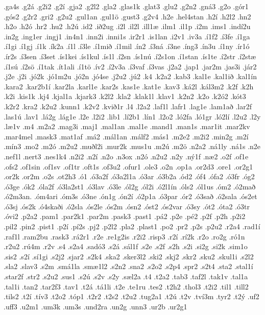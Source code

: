 {.ga4s
.g2á
.g2i2
.g2í
.gja2
.g2l2
.gla2
.glas1k
.glat3
.glu2
.g2n2
.gná3
.g2o
.gór1
.gós2
.g2r2
.gri2
.g2u2
.gul1an
.gul1ö
.gust3
.g2v4
.h2e
.hel4stan
.h2í
.h2l2
.hn2
.h2o
.h2ó
.hr2
.hu2
.h2ú
.id2
.ið2ug
.i2l
.il2l
.ill1æ
.ilm1
.il1p
.i2m
.ims1
.indí2u
.in2g
.ing1er
.ingj1
.in4n1
.inn2i
.inni1s
.ir2r1
.is1lan
.i2v1
.iv3a
.í1f2
.í3fe
.í1ga
.í1gi
.í1gj
.í1k
.ík2a
.í1l
.í3le
.í1mið
.í1mil
.ín2
.í3ná
.í3ne
.íng3
.ín3u
.í1ny
.ír1ó
.ír2s
.í3sen
.í3set
.ís1kei
.ís1kul
.ís1l
.í2sn
.ís1nú
.í2s1on
.í1stan
.ís1te
.í2str
.í2stæ
.í1sú
.í2sö
.í1tak
.ít1ali
.í1tö
.ív2
.í2v3a
.í3vaf
.í3vas
.j2a2
.jap1
.jar2m
.jas3i
.jár2
.j2e
.j2i
.jó2k
.jó1m2u
.jó2n
.jó4se
.j2u2
.jú2
.k4
.k2a2
.kab3
.kal1e
.kal1ið
.kal1ín
.kara2
.kar2b1í
.kar2la
.karl1e
.kar2s
.kas1e
.kat1e
.kav3
.ká2l
.kál3m2
.k2f
.k2h
.k2i
.kis1k
.kj4
.kjal1a
.kjark3
.k2l2
.kla2
.klak1l
.klav1
.k2n2
.k2o
.k2ó2
.kót3
.k2r2
.kra2
.k2u2
.kunn1
.k2v2
.kvið1r
.l4
.l2a2
.laf1l
.lafr1
.lag1e
.lam1að
.lar2f
.las1ú
.lav1
.lá2g
.lág1e
.l2e
.l2i2
.lib1
.lí2b1
.lín1
.l2o2
.ló2fa
.ló1gr
.ló2lí
.l2u2
.l2y
.læ1v
.m4
.m2a2
.mag3i
.maj1
.mal1an
.mal1e
.mand1
.man1s
.mar1it
.mar2kv
.mar4mel
.mask3
.mat1af
.má2
.mál1an
.málf2
.más1
.m2e2
.m2i2
.min2g
.m2í
.mín3
.mo2
.m2ó
.m2u2
.muðl2i
.mur2k
.mus1u
.m2ú
.m2ö
.n2a2
.ná1ly
.ná1s
.n2e
.nef1l
.nert3
.nes1k4
.n2i2
.n2í
.n2o
.n3ox
.n2ó
.n2u2
.n2y
.ný1f
.næ2
.o2f
.of1e
.ofs2
.of1sin
.of1sv
.of1tr
.oft1s
.of3u2
.ofur1
.ole3
.o2n
.op1a
.or2d3
.ore1
.or2g1
.or2k
.or2m
.o2s
.ot2h3
.ó1
.ó3a2f
.ó3a2l1a
.ó3ar
.ó3b2a
.ód2
.óf4
.ófa2
.ó3fr
.óg2
.ó3ge
.ók2
.óla2f
.ó3la2st1
.ó3lav
.ó3le
.ól2g
.ól2i
.ó2l1ín
.óls2
.ól1us
.óm2
.ó2mað
.ó2m3an.
.óm4ari
.óm3s
.ó3ne
.ón1g
.ón2í
.ó2p1a
.ó3par
.ór2
.ó3sað
.ó2sala
.ós2et
.ó3sj
.ós2k
.ó4skaði
.ó2sla
.ós2le
.ós2m
.ósn2
.óst2
.ós2var
.ó3sy
.ót2
.óta2
.ó3tr
.óvi2
.p2a2
.pam1
.par2k1
.par2m
.pask3
.past1
.pá2
.p2e
.pé2
.p2f
.p2h
.p2i2
.pil2
.pin2
.pist1
.p2í
.pí2s
.pj2
.p2l2
.pla2
.plast1
.po2
.pr2
.p2s
.p2u2
.r2a4
.rad1í
.raf1l
.ram2bu
.rask3
.rá2r1
.r2e
.re1g2is
.r2i2
.risp3
.r2í
.rí2k
.r2o
.ro2g
.ró1n
.r2u2
.rú4m
.r2v
.s4
.s2a4
.sadó3
.s2á
.sál1f
.s2e
.s2f
.s2h
.s2i
.si2g
.si2k
.sim1o
.sis2
.s2í
.sí1gi
.s2j2
.sjar2
.s2k4
.ska2
.sker3l2
.ski2
.skj2
.skr2
.sku2
.skul1i
.s2l2
.sla2
.slav3
.s2m
.smá1la
.smæ1l2
.s2n2
.sna2
.s2o2
.s2p4
.spr2
.s2t4
.sta2
.stal1í
.star2f
.str2
.s2u2
.sus1
.s2ú
.s2v
.s2y
.sæl2a
.t4
.t2a2
.tab3
.taf2l
.tak1v
.tal1a
.tal1i
.tan2
.tar2f3
.tav1
.t2á
.tá1li
.t2e
.te1ru
.tes2
.t2h2
.thol3
.t2i2
.til1
.till2
.tils2
.t2í
.tív3
.t2o2
.tóp1
.t2r2
.t2s2
.t2u2
.tug2a1
.t2ú
.t2v
.tví3m
.tyr2
.t2ý
.uf2
.uff3
.u2m1
.um3k
.um3s
.und2ra
.un2g
.unn3
.ur2b
.ur2g1
}
